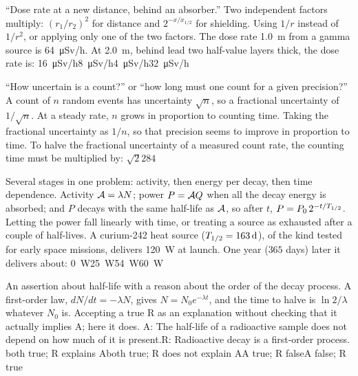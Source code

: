 {``Dose rate at a new distance, behind an absorber.''}
{Two independent factors multiply: $(r_1/r_2)^2$ for distance and $2^{-x/x_{1/2}}$ for shielding.}
{Using $1/r$ instead of $1/r^2$, or applying only one of the two factors.}
{The dose rate \SI{1.0}{m} from a gamma source is \SI{64}{\micro\sievert/h}. At \SI{2.0}{m}, behind lead two
half-value layers thick, the dose rate is:}
{\SI{16}{\micro\sievert/h}}{\SI{8}{\micro\sievert/h}}{\SI{4}{\micro\sievert/h}}{\SI{32}{\micro\sievert/h}
}

{``How uncertain is a count?'' or ``how long must one count for a given precision?''}
{A count of $n$ random events has uncertainty $\sqrt n$, so a fractional uncertainty of $1/\sqrt n$. At a
steady rate, $n$ grows in proportion to counting time.}
{Taking the fractional uncertainty as $1/n$, so that precision seems to improve in proportion to time.}
{To halve the fractional uncertainty of a measured count rate, the counting time must be multiplied by:}
{$\sqrt2$}{$2$}{$8$}{$4$}

{Several stages in one problem: activity, then energy per decay, then time dependence.}
{Activity $\mathcal{A}=\lambda N$; power $P=\mathcal{A} Q$ when all the decay energy is absorbed; and $P$ decays with the
same half-life as $\mathcal{A}$, so after $t$, $P=P_0\,2^{-t/T_{1/2}}$.}
{Letting the power fall linearly with time, or treating a source as exhausted after a couple of half-lives.}
{A curium-242 heat source ($T_{1/2}=\SI{163}{d}$), of the kind tested for early space missions, delivers
\SI{120}{W} at launch. One year ($365$ days) later it delivers about:}
{\SI{0}{W}}{\SI{25}{W}}{\SI{54}{W}}{\SI{60}{W}}

{An assertion about half-life with a reason about the order of the decay process.}
{A first-order law, $dN/dt=-\lambda N$, gives $N=N_0e^{-\lambda t}$, and the time to halve is $\ln2/\lambda$
whatever $N_0$ is.}
{Accepting a true R as an explanation without checking that it actually implies A; here it does.}
{A: The half-life of a radioactive sample does not depend on how much of it is present.\quad R: Radioactive
decay is a first-order process.}
{both true; R explains A}{both true; R does not explain A}{A true; R false}{A false; R true}

